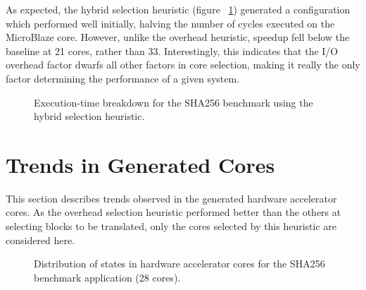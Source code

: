 \documentclass{UoYCSproject}
\begin{document}
As expected, the hybrid selection heuristic (figure ~\ref{fig:breakdownHybridSHA256}) generated
a configuration which performed well initially, halving the number of cycles executed on the MicroBlaze core.
However, unlike the overhead heuristic, speedup fell below the baseline at 21 cores, rather than 33.
Interestingly, this indicates that the I/O overhead factor dwarfs all other factors in core selection, making
it really the only factor determining the performance of a given system.

\begin{figure}[H]
\caption{Execution-time breakdown for the SHA256 benchmark using the hybrid selection heuristic.}
\label{fig:breakdownHybridSHA256}
\end{figure}

\section{Trends in Generated Cores}
\label{section:resultsTrends}

This section describes trends observed in the generated hardware accelerator cores.
As the overhead selection heuristic performed better than the others at selecting blocks to be
translated, only the cores selected by this heuristic are considered here.

\begin{figure}[H]
\caption{Distribution of states in hardware accelerator cores for the SHA256 benchmark application (28 cores).}
\label{fig:statesSHA256-28}
\end{figure}
\end{document}
